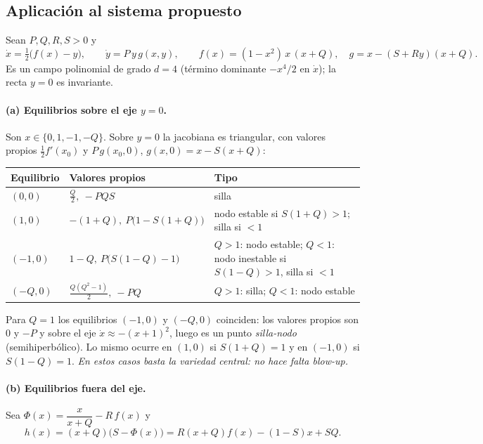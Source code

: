 \documentclass[11pt,a4paper]{article}
\theoremstyle{plain}
\theoremstyle{definition}
\theoremstyle{remark}
\begin{document}
\subsection{Aplicación al sistema propuesto}\label{sec:aplicacion}

Sean $P,Q,R,S>0$ y
\begin{equation}\label{eq:S}
\dot x=\tfrac12\big(f(x)-y\big),\qquad \dot y=P\,y\,g(x,y),\qquad
f(x)=(1-x^2)\,x\,(x+Q),\quad g=x-(S+Ry)(x+Q).
\end{equation}
Es un campo polinomial de grado $d=4$ (término dominante $-x^4/2$ en $\dot x$); la recta $y=0$ es invariante.

\paragraph{(a) Equilibrios sobre el eje $y=0$.} Son $x\in\{0,1,-1,-Q\}$. Sobre $y=0$ la jacobiana es triangular, con valores propios $\tfrac12f'(x_0)$ y $P\,g(x_0,0)$, $g(x,0)=x-S(x+Q)$:

\begin{center}
\begin{tabular}{@{}l l p{6.2cm}@{}}
\toprule
Equilibrio & Valores propios & Tipo \\
\midrule
$(0,0)$ & $\tfrac Q2,\ -PQS$ & silla \\
$(1,0)$ & $-(1+Q),\ P\big(1-S(1+Q)\big)$ & nodo estable si $S(1+Q)>1$; silla si $<1$ \\
$(-1,0)$ & $1-Q,\ P\big(S(1-Q)-1\big)$ & $Q>1$: nodo estable; $Q<1$: nodo inestable si $S(1-Q)>1$, silla si $<1$ \\
$(-Q,0)$ & $\tfrac{Q(Q^2-1)}2,\ -PQ$ & $Q>1$: silla; $Q<1$: nodo estable \\
\bottomrule
\end{tabular}
\end{center}

Para $Q=1$ los equilibrios $(-1,0)$ y $(-Q,0)$ coinciden: los valores propios son $0$ y $-P$ y sobre el eje $\dot x\approx-(x+1)^2$, luego es un punto \emph{silla-nodo} (semihiperbólico). Lo mismo ocurre en $(1,0)$ si $S(1+Q)=1$ y en $(-1,0)$ si $S(1-Q)=1$. \emph{En estos casos basta la variedad central: no hace falta blow-up.}

\paragraph{(b) Equilibrios fuera del eje.} Sea $\Phi(x)=\dfrac{x}{x+Q}-R\,f(x)$ y
\[
h(x)=(x+Q)\big(S-\Phi(x)\big)=R(x+Q)f(x)-(1-S)x+SQ .
\]
\end{document}
